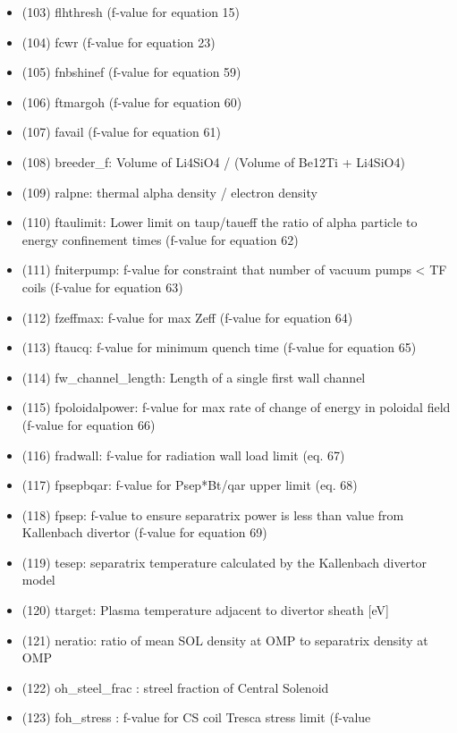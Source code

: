 \documentclass[]{article}
\begin{document}
\begin{itemize}
\begin{itemize}
    (102) fimpvar
  \item
    (103) flhthresh (f-value for equation 15)
  \item
    (104) fcwr (f-value for equation 23)
  \item
    (105) fnbshinef (f-value for equation 59)
  \item
    (106) ftmargoh (f-value for equation 60)
  \item
    (107) favail (f-value for equation 61)
  \item
    (108) breeder\_f: Volume of Li4SiO4 / (Volume of Be12Ti + Li4SiO4)
  \item
    (109) ralpne: thermal alpha density / electron density
  \item
    (110) ftaulimit: Lower limit on taup/taueff the ratio of alpha
    particle to energy confinement times (f-value for equation 62)
  \item
    (111) fniterpump: f-value for constraint that number of vacuum pumps
    \textless{} TF coils (f-value for equation 63)
  \item
    (112) fzeffmax: f-value for max Zeff (f-value for equation 64)
  \item
    (113) ftaucq: f-value for minimum quench time (f-value for equation
    65)
  \item
    (114) fw\_channel\_length: Length of a single first wall channel
  \item
    (115) fpoloidalpower: f-value for max rate of change of energy in
    poloidal field (f-value for equation 66)
  \item
    (116) fradwall: f-value for radiation wall load limit (eq. 67)
  \item
    (117) fpsepbqar: f-value for Psep*Bt/qar upper limit (eq. 68)
  \item
    (118) fpsep: f-value to ensure separatrix power is less than value
    from Kallenbach divertor (f-value for equation 69)
  \item
    (119) tesep: separatrix temperature calculated by the Kallenbach
    divertor model
  \item
    (120) ttarget: Plasma temperature adjacent to divertor sheath
    {[}eV{]}
  \item
    (121) neratio: ratio of mean SOL density at OMP to separatrix
    density at OMP
  \item
    (122) oh\_steel\_frac : streel fraction of Central Solenoid
  \item
    (123) foh\_stress : f-value for CS coil Tresca stress limit (f-value

\end{itemize}
\end{itemize}
\end{document}
